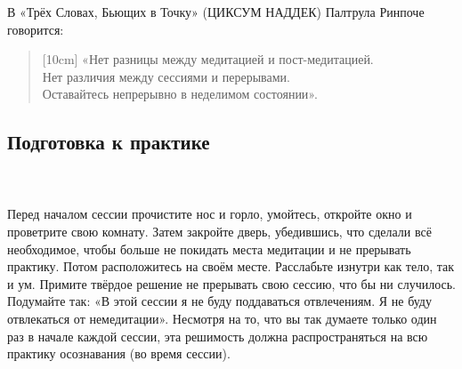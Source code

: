 В «Трёх Словах, Бьющих в Точку» (ЦИКСУМ НАДДЕК) Палтрула Ринпоче говорится:
\begin{verse}[10cm]
«Нет разницы между медитацией и пост-медитацией.
\\ Нет различия между сессиями и перерывами.
\\ Оставайтесь непрерывно в неделимом состоянии».
\end{verse}
\newpage
\subsection{Подготовка к практике}
\\ \\ Перед началом сессии прочистите нос и горло, умойтесь, откройте окно и проветрите свою комнату. Затем закройте дверь, убедившись, что сделали всё необходимое, чтобы больше не покидать места медитации и не прерывать практику. Потом расположитесь на своём месте. Расслабьте изнутри как тело, так и ум. Примите твёрдое решение не прерывать свою сессию, что бы ни случилось. Подумайте так: «В этой сессии я не буду поддаваться отвлечениям. Я не буду отвлекаться от немедитации». Несмотря на то, что вы так думаете только один раз в начале каждой сессии, эта решимость должна распространяться на всю практику осознавания (во время сессии).
